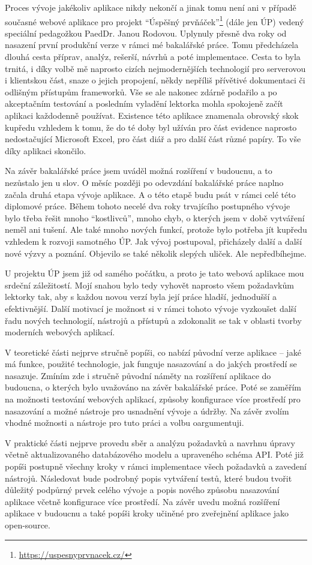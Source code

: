 Proces vývoje jakékoliv aplikace nikdy nekončí a jinak tomu není ani v případě současné webové aplikace pro projekt \enquote{Úspěšný prvňáček}\footnote{\url{https://uspesnyprvnacek.cz/}} (dále jen ÚP) vedený speciální pedagožkou PaedDr. Janou Rodovou. Uplynuly přesně dva roky od nasazení první produkční verze v rámci mé bakalářské práce. Tomu předcházela dlouhá cesta příprav, analýz, rešerší, návrhů a poté implementace. Cesta to byla trnitá, i díky volbě mě naprosto cizích nejmodernějších technologií pro serverovou i klientskou část, snaze o jejich propojení, někdy nepříliš přívětivé dokumentaci či odlišným přístupům frameworků. Vše se ale nakonec zdárně podařilo a po akceptačním testování a posledním vyladění lektorka mohla spokojeně začít aplikaci každodenně používat. Existence této aplikace znamenala obrovský skok kupředu vzhledem k tomu, že do té doby byl užíván pro část evidence naprosto nedostačující Microsoft Excel, pro část diář a pro další část různé papíry. To vše díky aplikaci skončilo.

Na závěr bakalářské práce jsem uváděl možná rozšíření v budoucnu, a to nezůstalo jen u slov. O měsíc později po odevzdání bakalářské práce naplno začala druhá etapa vývoje aplikace. A o této etapě budu psát v rámci celé této diplomové práce. Během tohoto necelé dva roky trvajícího postupného vývoje bylo třeba řešit mnoho \enquote{kostlivců}, mnoho chyb, o kterých jsem v době vytváření neměl ani tušení. Ale také mnoho nových funkcí, protože bylo potřeba jít kupředu vzhledem k rozvoji samotného ÚP. Jak vývoj postupoval, přicházely další a další nové výzvy a poznání. Objevilo se také několik slepých uliček. Ale nepředbíhejme.

U projektu ÚP jsem již od samého počátku, a proto je tato webová aplikace mou srdeční záležitostí. Mojí snahou bylo tedy vyhovět naprosto všem požadavkům lektorky tak, aby s každou novou verzí byla její práce hladší, jednodušší a efektivnější. Další motivací je možnost si v rámci tohoto vývoje vyzkoušet další řadu nových technologií, nástrojů a přístupů a zdokonalit se tak v oblasti tvorby moderních webových aplikací.

V teoretické části nejprve stručně popíši, co nabízí původní verze aplikace -- jaké má funkce, použité technologie, jak funguje nasazování a do jakých prostředí se nasazuje. Zmíním zde i stručně původní náměty na rozšíření aplikace do budoucna, o kterých bylo uvažováno na závěr bakalářské práce. Poté se zaměřím na možnosti testování webových aplikací, způsoby konfigurace více prostředí pro nasazování a možné nástroje pro usnadnění vývoje a údržby. Na závěr zvolím vhodné možnosti a nástroje pro tuto práci a volbu oargumentuji.

V praktické části nejprve provedu sběr a analýzu požadavků a navrhnu úpravy včetně aktualizovaného databázového modelu a upraveného schéma API. Poté již popíši postupně všechny kroky v rámci implementace všech požadavků a zavedení nástrojů. Následovat bude podrobný popis vytváření testů, které budou tvořit důležitý podpůrný prvek celého vývoje a popis nového způsobu nasazování aplikace včetně konfigurace více prostředí. Na závěr uvedu možná rozšíření aplikace v budoucnu a také popíši kroky učiněné pro zveřejnění aplikace jako open-source.